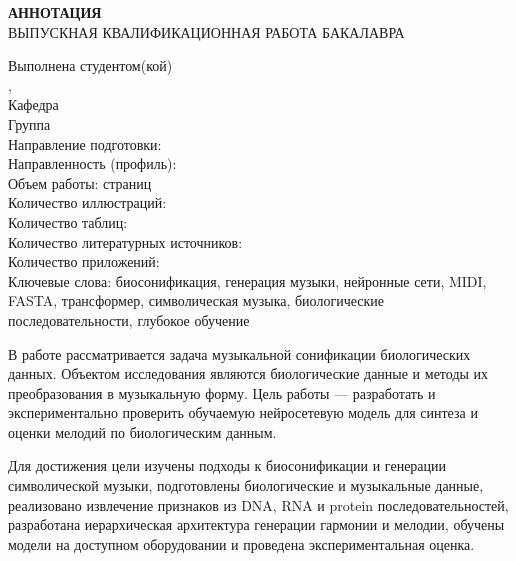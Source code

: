 \newpage
\thispagestyle{empty}

\begin{par}
\setlength{\baselineskip}{5mm}

\begin{center}
    \textbf{АННОТАЦИЯ} \\
    \vspace{5mm}
    ВЫПУСКНАЯ КВАЛИФИКАЦИОННАЯ РАБОТА БАКАЛАВРА \\
    \noindent
\end{center}

\begin{flushleft}
    Выполнена студентом(кой) \uline{\studentforabstract\hfill} \\
    \faculty, \university \\
    Кафедра \uline{\department\hfill} \\
    Группа \uline{\group} \\
    Направление подготовки: \programnum\thinspace\programname \\
    Направленность (профиль): \specialization \\
    \vspace{5mm}
    Объем работы:  страниц \\
    Количество иллюстраций: \totalfigures \\
    Количество таблиц: \totaltables \\
    Количество литературных источников:  \\
    Количество приложений:  \\
    Ключевые слова: биосонификация, генерация музыки, нейронные сети, MIDI, FASTA, трансформер, символическая музыка, биологические последовательности, глубокое обучение
\end{flushleft}

В работе рассматривается задача музыкальной сонификации биологических данных. Объектом исследования являются биологические данные и методы их преобразования в музыкальную форму. Цель работы — разработать и экспериментально проверить обучаемую нейросетевую модель для синтеза и оценки мелодий по биологическим данным.

Для достижения цели изучены подходы к биосонификации и генерации символической музыки, подготовлены биологические и музыкальные данные, реализовано извлечение признаков из DNA, RNA и protein последовательностей, разработана иерархическая архитектура генерации гармонии и мелодии, обучены модели на доступном оборудовании и проведена экспериментальная оценка.


\end{par}
